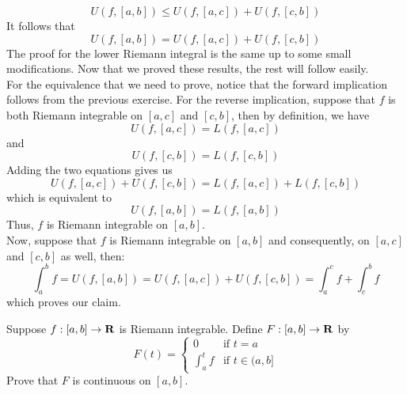 \begin{solution}
    $$U(f, [a,b]) \leq U(f, [a,c]) + U(f, [c,b])$$
    It follows that
    $$U(f, [a,b]) = U(f, [a,c]) + U(f, [c,b])$$
    The proof for the lower Riemann integral is the same up to some small modifications. Now that we proved these results, the rest will follow easily.\\
    For the equivalence that we need to prove, notice that the forward implication follows from the previous exercise. For the reverse implication, suppose that $f$ is both Riemann integrable on $[a,c]$ and $[c,b]$, then by definition, we have
    $$U(f, [a,c]) = L(f, [a,c])$$
    and 
    $$U(f, [c,b]) = L(f, [c,b])$$
    Adding the two equations gives us
    $$U(f, [a,c]) + U(f, [c,b]) = L(f, [a,c]) + L(f, [c,b])$$
    which is equivalent to
    $$U(f, [a,b]) = L(f, [a,b])$$
    Thus, $f$ is Riemann integrable on $[a,b]$. \\
    Now, suppose that $f$ is Riemann integrable on $[a,b]$ and consequently, on $[a,c]$ and $[c, b]$ as well, then:
    $$\int_{a}^{b}f = U(f, [a,b]) = U(f, [a,c]) + U(f, [c,b]) = \int_{a}^{c}f + \int_{c}^{b}f$$
    which proves our claim. \\
\end{solution}

\begin{exercise}
    Suppose $f:[a,b] \to \mathbf{R}$ is Riemann integrable. Define $F:[a,b] \to \mathbf{R}$ by
    $$F(t) = \begin{cases}
        0 & \text{if }t=a \\
        \int_{a}^{t}f & \text{if }t \in (a, b]
    \end{cases}$$
    Prove that $F$ is continuous on $[a,b]$. \\
\end{exercise}


